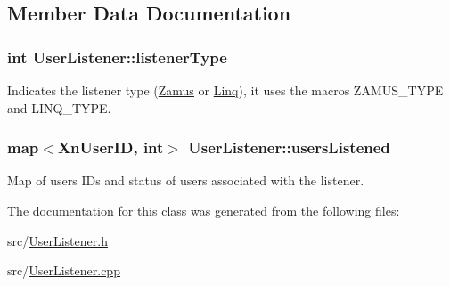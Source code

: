\subsection{Member Data Documentation}
\hypertarget{classUserListener_a97d89eef39e5c96b3d94582aad460cfe}{
\subsubsection[{listenerType}]{\setlength{\rightskip}{0pt plus 5cm}int {\bf UserListener::listenerType}}}
\label{classUserListener_a97d89eef39e5c96b3d94582aad460cfe}
Indicates the listener type (\hyperlink{classZamus}{Zamus} or \hyperlink{classLinq}{Linq}), it uses the macros ZAMUS\_\-TYPE and LINQ\_\-TYPE. \hypertarget{classUserListener_ad061c4f8f4041c730b4b1f14a11b288a}{
\subsubsection[{usersListened}]{\setlength{\rightskip}{0pt plus 5cm}map$<$XnUserID, int$>$ {\bf UserListener::usersListened}}}
\label{classUserListener_ad061c4f8f4041c730b4b1f14a11b288a}
Map of users IDs and status of users associated with the listener. 

The documentation for this class was generated from the following files:\begin{DoxyCompactItemize}
\item 
src/\hyperlink{UserListener_8h}{UserListener.h}\item 
src/\hyperlink{UserListener_8cpp}{UserListener.cpp}\end{DoxyCompactItemize}
